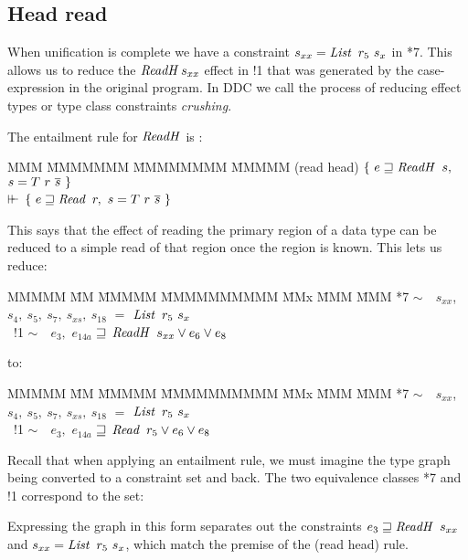 \subsection{Head read}

When unification is complete we have a constraint $s_{xx} = \operatorname{\mathit{List}} \ r_5 \ s_x$ in *7. This allows us to reduce the $\operatorname{\mathit{ReadH}} s_{xx}$ effect in !1 that was generated by the case-expression in the original program. In DDC we call the process of reducing effect types or type class constraints \emph{crushing}.

The entailment rule for $\operatorname{\mathit{ReadH}}$ is :
\begin{tabbing}
MMM \= MMMMMMM \= MMMMMMMM \= MMMMM \kill
	\> (read head)		\> $\{ \ e \sqsupseteq \operatorname{\mathit{ReadH}} \ s,$ 	\> $s = T \ r \ \ov{s} \ \}$ \\
	\> \qq $\vdash\mkern-6mu\vdash$	\> $\{ \ e \sqsupseteq \operatorname{\mathit{Read}} \ r,$	\> $s = T \ r \ \ov{s} \ \}$	
\end{tabbing}
This says that the effect of reading the primary region of a data type can be reduced to a simple read of that region once the region is known. This lets us reduce:
\qq\qq
\begin{tabbing}
MMMMM 	\= MM 	\= MMMMM 	\= MMMMMMMMMM 		\= MMx \= MMM \= MMM \kill
	\> *7	\> $\sim \quad s_{xx}$,	\> $s_4, \ s_5, \ s_7, \ s_{xs}, \ s_{18}$	
		\> \quad $=$		\> $\operatorname{\mathit{List}} \ r_5 \ s_x$
	\\
	\> \ !1	\> $\sim \quad e_3,$	\> $e_{14a}$		
		\> \quad $\sqsupseteq$		\> $\operatorname{\mathit{ReadH}} \ s_{xx} \lor e_6 \lor e_8$ 
\end{tabbing}
\vspace{-1em}
to:
\qq\qq
\begin{tabbing}
MMMMM 	\= MM 	\= MMMMM 	\= MMMMMMMMMM 		\= MMx \= MMM \= MMM \kill
	\> *7	\> $\sim \quad s_{xx}$,	\> $s_4, \ s_5, \ s_7, \ s_{xs}, \ s_{18}$	
		\> \quad $=$	\> $\operatorname{\mathit{List}} \ r_5 \ s_x$
	\\
	\> \ !1	\> $\sim \quad e_3,$	\> $e_{14a}$		
		\> \quad $\sqsupseteq$	\> $\operatorname{\mathit{Read}} \ r_5 \lor e_6 \lor e_8$ 
\end{tabbing}

Recall that when applying an entailment rule, we must imagine the type graph being converted to a constraint set and back. The two equivalence classes *7 and !1 correspond to the set:


Expressing the graph in this form separates out the constraints $e_3 \sqsupseteq \operatorname{\mathit{ReadH}} \ s_{xx}$ and $s_{xx} = \operatorname{\mathit{List}} \ r_5 \ s_x$, which match the premise of the (read head) rule.
